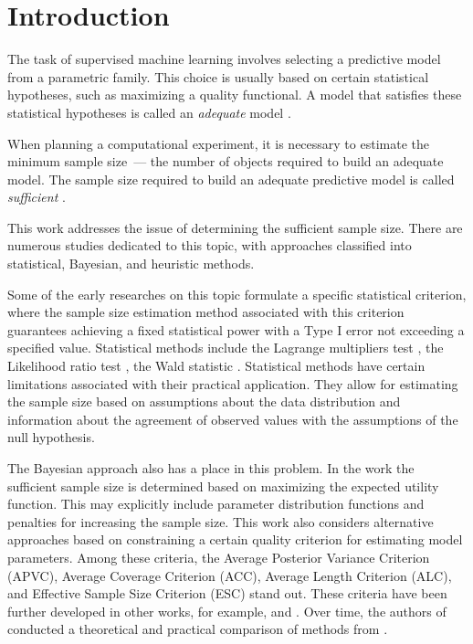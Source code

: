 \documentclass[
11pt,%
tightenlines,%
twoside,%
onecolumn,%
nofloats,%
nobibnotes,%
nofootinbib,%
superscriptaddress,%
noshowpacs,%
centertags]%
{revtex4-2}
\begin{document}
\maketitle


\section{Introduction}

The task of supervised machine learning involves selecting a predictive model from a parametric family. This choice is usually based on certain statistical hypotheses, such as maximizing a quality functional. A model that satisfies these statistical hypotheses is called an \textit{adequate} model \cite{bies2006genetic, cawley2010over, raschka2018model}.

When planning a computational experiment, it is necessary to estimate the minimum sample size~--- the number of objects required to build an adequate model. The sample size required to build an adequate predictive model is called \textit{sufficient} \cite{byrd2012sample, figueroa2012predicting, balki2019sample}. 

This work addresses the issue of determining the sufficient sample size. There are numerous studies dedicated to this topic, with approaches classified into statistical, Bayesian, and heuristic methods.

Some of the early researches on this topic \cite{Adcock1988, Joseph1995} formulate a specific statistical criterion, where the sample size estimation method associated with this criterion guarantees achieving a fixed statistical power with a Type I error not exceeding a specified value. Statistical methods include the Lagrange multipliers test \cite{self1988power}, the Likelihood ratio test \cite{shieh2000power}, the Wald statistic \cite{shieh2005power}. Statistical methods have certain limitations associated with their practical application. They allow for estimating the sample size based on assumptions about the data distribution and information about the agreement of observed values with the assumptions of the null hypothesis.

The Bayesian approach also has a place in this problem. In the work \cite{Lindley1997} the sufficient sample size is determined based on maximizing the expected utility function. This may explicitly include parameter distribution functions and penalties for increasing the sample size. This work also considers alternative approaches based on constraining a certain quality criterion for estimating model parameters. Among these criteria, the Average Posterior Variance Criterion (APVC), Average Coverage Criterion (ACC), Average Length Criterion (ALC), and Effective Sample Size Criterion (ESC) stand out. These criteria have been further developed in other works, for example, \cite{PhamGia1997} and \cite{Gelfand2002}. Over time, the authors of \cite{Cao2009} conducted a theoretical and practical comparison of methods from \cite{Adcock1988, Joseph1995, Lindley1997}.
\end{document}
